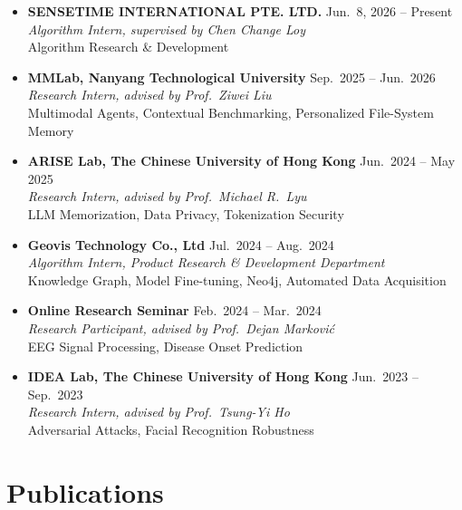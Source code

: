 \documentclass[a4paper,11pt]{article}
\newcommand{\expentry}[4]{%
  \item \textbf{#1} \hfill #2 \\
    \textit{#3} \\
    #4
}
\begin{document}
\begin{itemize}[itemsep=6pt]
  \expentry{SENSETIME INTERNATIONAL PTE. LTD.}{Jun.\ 8, 2026 -- Present}%
    {Algorithm Intern, supervised by Chen Change Loy}%
    {Algorithm Research \& Development}

  \expentry{MMLab, Nanyang Technological University}{Sep.\ 2025 -- Jun.\ 2026}%
    {Research Intern, advised by Prof.\ Ziwei Liu}%
    {Multimodal Agents, Contextual Benchmarking, Personalized File-System Memory}

  \expentry{ARISE Lab, The Chinese University of Hong Kong}{Jun.\ 2024 -- May 2025}%
    {Research Intern, advised by Prof.\ Michael R.\ Lyu}%
    {LLM Memorization, Data Privacy, Tokenization Security}

  \expentry{Geovis Technology Co., Ltd}{Jul.\ 2024 -- Aug.\ 2024}%
    {Algorithm Intern, Product Research \& Development Department}%
    {Knowledge Graph, Model Fine-tuning, Neo4j, Automated Data Acquisition}

  \expentry{Online Research Seminar}{Feb.\ 2024 -- Mar.\ 2024}%
    {Research Participant, advised by Prof.\ Dejan Markovi\'{c}}%
    {EEG Signal Processing, Disease Onset Prediction}

  \expentry{IDEA Lab, The Chinese University of Hong Kong}{Jun.\ 2023 -- Sep.\ 2023}%
    {Research Intern, advised by Prof.\ Tsung-Yi Ho}%
    {Adversarial Attacks, Facial Recognition Robustness}
\end{itemize}

\section{Publications}
\end{document}
